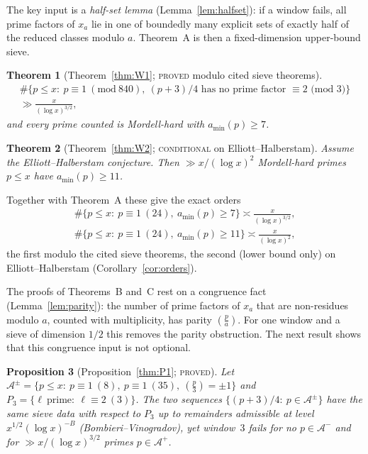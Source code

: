 \documentclass[11pt,reqno]{amsart}
\newtheorem{introthm}{Theorem}
\newtheorem{introprop}[introthm]{Proposition}
\theoremstyle{definition}
\newcommand{\amin}{a_{\min}}
\newcommand{\leg}[2]{\left(\frac{#1}{#2}\right)}
\newcommand{\status}[1]{\textup{\textsc{#1}}}
\begin{document}
The key input is a \emph{half-set lemma} (Lemma~\ref{lem:halfset}): if a
window fails, all prime factors of $x_a$ lie in one of boundedly many
explicit sets of exactly half of the reduced classes modulo $a$.  Theorem~A
is then a fixed-dimension upper-bound sieve.

\begin{introthm}[Theorem~\ref{thm:W1}; \status{proved} modulo cited sieve theorems]\label{thmB}
\begin{multline*}
 \#\{p\le x:\ p\equiv1\ (\mathrm{mod}\ 840),\ \text{$(p+3)/4$ has no prime factor $\equiv2$ (mod 3)}\}\\
 \gg\frac{x}{(\log x)^{3/2}},
\end{multline*}
and every prime counted is Mordell-hard with $\amin(p)\ge7$.
\end{introthm}

\begin{introthm}[Theorem~\ref{thm:W2}; \status{conditional} on Elliott--Halberstam]\label{thmC}
Assume the Elliott--Halberstam conjecture.  Then $\gg x/(\log x)^2$
Mordell-hard primes $p\le x$ have $\amin(p)\ge11$.
\end{introthm}

Together with Theorem~A these give the exact orders
\begin{gather*}
 \#\{p\le x:\ p\equiv1\ (24),\ \amin(p)\ge7\}\asymp\frac{x}{(\log x)^{3/2}},\\
 \#\{p\le x:\ p\equiv1\ (24),\ \amin(p)\ge11\}\asymp\frac{x}{(\log x)^{2}},
\end{gather*}
the first modulo the cited sieve theorems, the second (lower bound only)
on Elliott--Halberstam (Corollary~\ref{cor:orders}).

The proofs of Theorems~B and~C rest on a congruence fact
(Lemma~\ref{lem:parity}): the number of prime factors of $x_a$ that are
non-residues modulo $a$, counted with multiplicity, has parity
$\leg pa$.  For one window and a sieve of dimension $1/2$ this removes the
parity obstruction.  The next result shows that this congruence input is
not optional.

\begin{introprop}[Proposition~\ref{thm:P1}; \status{proved}]\label{thmD}
Let $\mathcal A^{\pm}=\{p\le x:\ p\equiv1\ (8),\ p\equiv1\ (35),\ \leg p3=\pm1\}$
and $P_3=\{\ell\ \text{prime}:\ \ell\equiv2\ (3)\}$.  The two sequences
$\{(p+3)/4:\ p\in\mathcal A^{\pm}\}$ have the same sieve data with respect
to $P_3$ up to remainders admissible at level $x^{1/2}(\log x)^{-B}$
(Bombieri--Vinogradov), yet window~$3$ fails for no $p\in\mathcal A^-$
and for $\gg x/(\log x)^{3/2}$ primes $p\in\mathcal A^+$.
\end{introprop}
\end{document}
